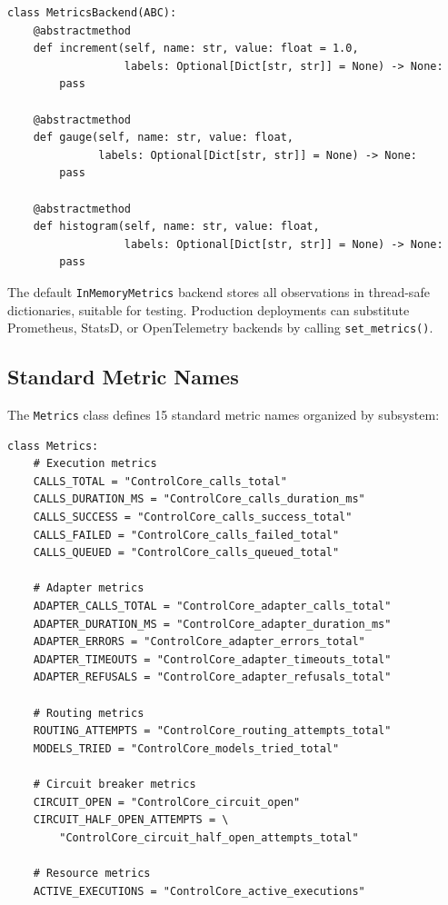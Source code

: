 \documentclass[11pt,a4paper]{article}
\theoremstyle{plain}
\theoremstyle{definition}
\begin{document}
\begin{lstlisting}[style=pythonstyle, caption={MetricsBackend ABC from \texttt{observability.py}}]
class MetricsBackend(ABC):
    @abstractmethod
    def increment(self, name: str, value: float = 1.0,
                  labels: Optional[Dict[str, str]] = None) -> None:
        pass

    @abstractmethod
    def gauge(self, name: str, value: float,
              labels: Optional[Dict[str, str]] = None) -> None:
        pass

    @abstractmethod
    def histogram(self, name: str, value: float,
                  labels: Optional[Dict[str, str]] = None) -> None:
        pass
\end{lstlisting}

The default \texttt{InMemoryMetrics} backend stores all observations in
thread-safe dictionaries, suitable for testing. Production deployments can
substitute Prometheus, StatsD, or OpenTelemetry backends by calling
\texttt{set\_metrics()}.

\subsection{Standard Metric Names}

The \texttt{Metrics} class defines 15 standard metric names organized by
subsystem:

\begin{lstlisting}[style=pythonstyle, caption={Metric name constants from \texttt{observability.py}}]
class Metrics:
    # Execution metrics
    CALLS_TOTAL = "ControlCore_calls_total"
    CALLS_DURATION_MS = "ControlCore_calls_duration_ms"
    CALLS_SUCCESS = "ControlCore_calls_success_total"
    CALLS_FAILED = "ControlCore_calls_failed_total"
    CALLS_QUEUED = "ControlCore_calls_queued_total"

    # Adapter metrics
    ADAPTER_CALLS_TOTAL = "ControlCore_adapter_calls_total"
    ADAPTER_DURATION_MS = "ControlCore_adapter_duration_ms"
    ADAPTER_ERRORS = "ControlCore_adapter_errors_total"
    ADAPTER_TIMEOUTS = "ControlCore_adapter_timeouts_total"
    ADAPTER_REFUSALS = "ControlCore_adapter_refusals_total"

    # Routing metrics
    ROUTING_ATTEMPTS = "ControlCore_routing_attempts_total"
    MODELS_TRIED = "ControlCore_models_tried_total"

    # Circuit breaker metrics
    CIRCUIT_OPEN = "ControlCore_circuit_open"
    CIRCUIT_HALF_OPEN_ATTEMPTS = \
        "ControlCore_circuit_half_open_attempts_total"

    # Resource metrics
    ACTIVE_EXECUTIONS = "ControlCore_active_executions"
\end{lstlisting}
\end{document}
